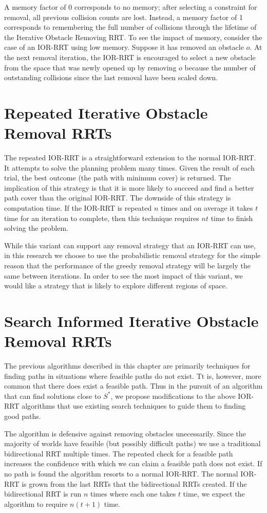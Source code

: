 A memory factor of 0 corresponds to no memory; after selecting a constraint for removal, all previous collision counts are lost. Instead, a memory factor of 1 corresponds to remembering the full number of collisions through the lifetime of the Iterative Obstacle Removing RRT. To see the impact of memory, consider the case of an IOR-RRT using low memory. Suppose it has removed an obstacle $o$. At the next removal iteration, the IOR-RRT is encouraged to select a new obstacle from the space that was newly opened up by removing $o$ because the number of outstanding collisions since the last removal have been scaled down. 

\section{Repeated Iterative Obstacle Removal RRTs}
The repeated IOR-RRT is a straightforward extension to the normal IOR-RRT. It attempts to solve the planning problem many times. Given the result of each trial, the best outcome (the path with minimum cover) is returned. The implication of this strategy is that it is more likely to succeed and find a better path cover than the original IOR-RRT. The downside of this strategy is computation time. If the IOR-RRT is repeated $n$ times and on average it takes $t$ time for an iteration to complete, then this technique requires $nt$ time to finish solving the problem.

While this variant can support any removal strategy that an IOR-RRT can use, in this research we choose to use the probabilistic removal strategy for the simple reason that the performance of the greedy removal strategy will be largely the same between iterations. In order to see the most impact of this variant, we would like a strategy that is likely to explore different regions of space.

\section{Search Informed Iterative Obstacle Removal RRTs}
The previous algorithms described in this chapter are primarily techniques for finding paths in situations where feasible paths do not exist. Tt is, however, more common that there does exist a feasible path. Thus in the pursuit of an algorithm that can find solutions close to $S^{*}$, we propose modifications to the above IOR-RRT algorithms that use existing search techniques to guide them to finding good paths.

The algorithm is defensive against removing obstacles unecessarily. Since the majority of worlds have feasible (but possibly difficult paths) we use a traditional bidirectional RRT multiple times. The repeated check for a feasible path increases the confidence with which we can claim a feasible path does not exist. If no path is found the algorithm resorts to a normal IOR-RRT. The normal IOR-RRT is grown from the last RRTs that the bidirectional RRTs created. If the bidirectional RRT is run $n$ times where each one takes $t$ time, we expect the algorithm to require $n(t+1)$ time. 

